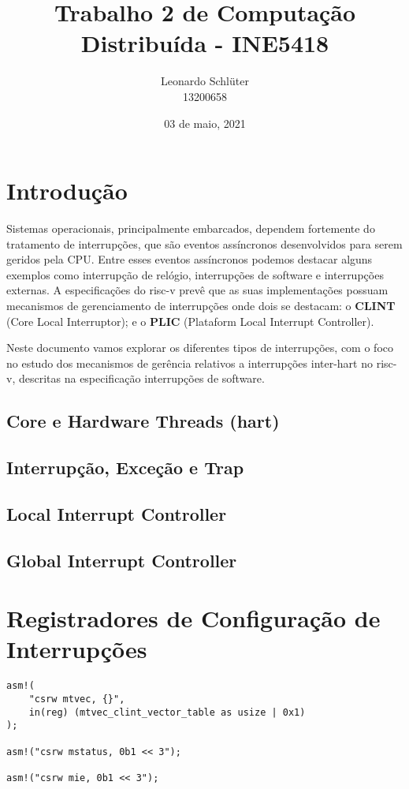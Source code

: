 \documentclass{article}
\title{Trabalho 2 de Computação Distribuída - INE5418}
\author{Leonardo Schlüter \\ 13200658}
\date{03 de maio, 2021}
\begin{document}
\maketitle

\section{Introdução}

Sistemas operacionais, principalmente embarcados, dependem fortemente do tratamento de interrupções, que são eventos assíncronos desenvolvidos para serem geridos pela CPU.
Entre esses eventos assíncronos podemos destacar alguns exemplos como interrupção de relógio, interrupções de software e interrupções externas.
A especificações do risc-v prevê que as suas implementações possuam mecanismos de gerenciamento de interrupções onde dois se destacam: o \textbf{CLINT} (Core Local Interruptor); e o \textbf{PLIC} (Plataform Local Interrupt Controller). 

Neste documento vamos explorar os diferentes tipos de interrupções, com o foco no estudo dos mecanismos de gerência relativos a interrupções inter-hart no risc-v, descritas na especificação interrupções de software.

\subsection{Core e Hardware Threads (hart)}


\subsection{Interrupção, Exceção e Trap}



\subsection{Local Interrupt Controller}


\subsection{Global Interrupt Controller}



\section{Registradores de Configuração de Interrupções}

\begin{lstlisting} 
asm!(
    "csrw mtvec, {}",
    in(reg) (mtvec_clint_vector_table as usize | 0x1)
);

asm!("csrw mstatus, 0b1 << 3");

asm!("csrw mie, 0b1 << 3");
\end{lstlisting}
    
\end{document}
